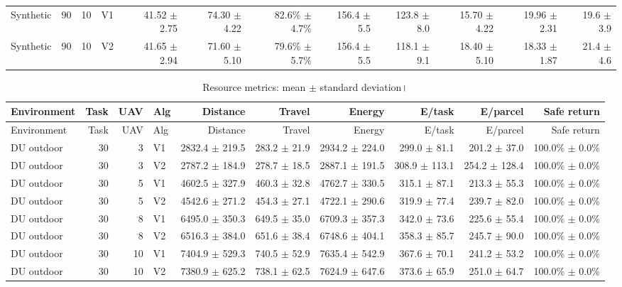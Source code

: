 \documentclass[10pt,a4paper]{article}
\begin{document}
\begin{landscape}
\begin{longtable}{@{}lrrlrrrrrrrr@{}}
Synthetic & 90 & 10 & V1 & 41.52 $\pm$ 2.75 & 74.30 $\pm$ 4.22 & 82.6\% $\pm$ 4.7\% & 156.4 $\pm$ 5.5 & 123.8 $\pm$ 8.0 & 15.70 $\pm$ 4.22 & 19.96 $\pm$ 2.31 & 19.6 $\pm$ 3.9 \\
Synthetic & 90 & 10 & V2 & 41.65 $\pm$ 2.94 & 71.60 $\pm$ 5.10 & 79.6\% $\pm$ 5.7\% & 156.4 $\pm$ 5.5 & 118.1 $\pm$ 9.1 & 18.40 $\pm$ 5.10 & 18.33 $\pm$ 1.87 & 21.4 $\pm$ 4.6 \\
\bottomrule\end{longtable}\end{landscape}
\begin{landscape}\begin{longtable}{@{}lrrlrrrrrr@{}}
\caption{Resource metrics: mean $\pm$ standard deviation।}\label{tab:v2-resource-metrics}\\
\toprule Environment & Task & UAV & Alg & Distance & Travel & Energy & E/task & E/parcel & Safe return\\\midrule
\endfirsthead\toprule Environment & Task & UAV & Alg & Distance & Travel & Energy & E/task & E/parcel & Safe return\\\midrule\endhead
DU outdoor & 30 & 3 & V1 & 2832.4 $\pm$ 219.5 & 283.2 $\pm$ 21.9 & 2934.2 $\pm$ 224.0 & 299.0 $\pm$ 81.1 & 201.2 $\pm$ 37.0 & 100.0\% $\pm$ 0.0\% \\
DU outdoor & 30 & 3 & V2 & 2787.2 $\pm$ 184.9 & 278.7 $\pm$ 18.5 & 2887.1 $\pm$ 191.5 & 308.9 $\pm$ 113.1 & 254.2 $\pm$ 128.4 & 100.0\% $\pm$ 0.0\% \\
DU outdoor & 30 & 5 & V1 & 4602.5 $\pm$ 327.9 & 460.3 $\pm$ 32.8 & 4762.7 $\pm$ 330.5 & 315.1 $\pm$ 87.1 & 213.3 $\pm$ 55.3 & 100.0\% $\pm$ 0.0\% \\
DU outdoor & 30 & 5 & V2 & 4542.6 $\pm$ 271.2 & 454.3 $\pm$ 27.1 & 4722.1 $\pm$ 290.6 & 319.9 $\pm$ 77.4 & 239.7 $\pm$ 82.0 & 100.0\% $\pm$ 0.0\% \\
DU outdoor & 30 & 8 & V1 & 6495.0 $\pm$ 350.3 & 649.5 $\pm$ 35.0 & 6709.3 $\pm$ 357.3 & 342.0 $\pm$ 73.6 & 225.6 $\pm$ 55.4 & 100.0\% $\pm$ 0.0\% \\
DU outdoor & 30 & 8 & V2 & 6516.3 $\pm$ 384.0 & 651.6 $\pm$ 38.4 & 6748.6 $\pm$ 404.1 & 358.3 $\pm$ 85.7 & 245.7 $\pm$ 90.0 & 100.0\% $\pm$ 0.0\% \\
DU outdoor & 30 & 10 & V1 & 7404.9 $\pm$ 529.3 & 740.5 $\pm$ 52.9 & 7635.4 $\pm$ 542.9 & 367.6 $\pm$ 70.1 & 241.2 $\pm$ 53.2 & 100.0\% $\pm$ 0.0\% \\
DU outdoor & 30 & 10 & V2 & 7380.9 $\pm$ 625.2 & 738.1 $\pm$ 62.5 & 7624.9 $\pm$ 647.6 & 373.6 $\pm$ 65.9 & 251.0 $\pm$ 64.7 & 100.0\% $\pm$ 0.0\% \\

\end{longtable}
\end{landscape}
\end{document}
